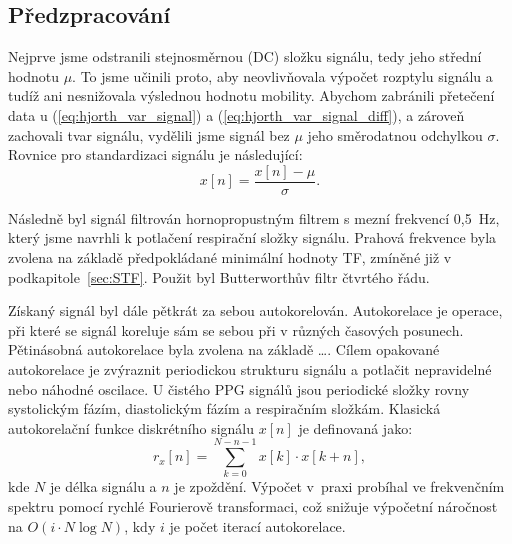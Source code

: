 \subsection*{Předzpracování}
\label{sec:predzpracovani}
Nejprve jsme odstranili stejnosměrnou (\acs{DC}) složku signálu, tedy jeho střední hodnotu \(\mu\).
To jsme učinili proto, aby neovlivňovala výpočet rozptylu signálu a tudíž ani nesnižovala výslednou hodnotu mobility.
Abychom zabránili přetečení data u (\ref{eq:hjorth_var_signal}) a (\ref{eq:hjorth_var_signal_diff}), a zároveň zachovali tvar signálu, vydělili jsme signál bez \( \mu \) jeho směrodatnou odchylkou \( \sigma \).
Rovnice pro standardizaci signálu je následující:
\begin{equation}
	x[n] = \frac{x[n] - \mu}{\sigma}.
\end{equation}

Následně byl signál filtrován hornopropustným filtrem s mezní frekvencí 0,5~Hz, který jsme navrhli k potlačení respirační složky signálu.
Prahová frekvence byla zvolena na základě předpokládané minimální hodnoty \acs{TF}, zmíněné již v podkapitole~\ref{sec:STF}.
Použit byl Butterworthův filtr čtvrtého řádu.

Získaný signál byl dále pětkrát za sebou autokorelován. %
Autokorelace je operace, při které se signál koreluje sám se sebou při v různých časových posunech.
Pětinásobná autokorelace byla zvolena na základě \dots. %
Cílem opakované autokorelace je zvýraznit periodickou strukturu signálu a potlačit nepravidelné nebo náhodné oscilace.
U čistého \acs{PPG} signálů jsou periodické složky rovny systolickým fázím, diastolickým fázím a respiračním složkám.
Klasická autokorelační funkce diskrétního signálu \( x[n] \) je definovaná jako:
\begin{equation}
	r_x[n] = \sum_{k=0}^{N-n-1} x[k] \cdot x[k+n],
\end{equation}
kde \( N \) je délka signálu a \( n \) je zpoždění.
Výpočet v~praxi probíhal ve frekvenčním spektru pomocí rychlé Fourierově transformaci, což snižuje výpočetní náročnost na \( O(i \cdot N \log N) \), kdy \( i \) je počet iterací autokorelace.

